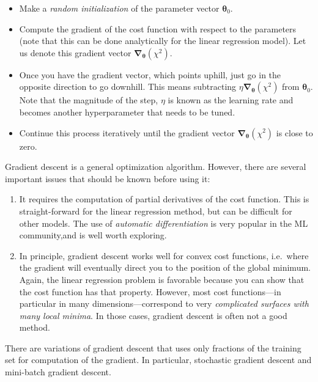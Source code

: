 \documentclass[%
oneside,                 %
final,                   %
10pt]{article}
\begin{document}
\begin{itemize}
\item Make a \emph{random initialization} of the parameter vector $\bm{\theta}_0$.

\item Compute the gradient of the cost function with respect to the parameters (note that this can be done analytically for the linear regression model). Let us denote this gradient vector $\bm{\nabla}_{\bm{\theta}} \left( \chi^2 \right)$.

\item Once you have the gradient vector, which points uphill, just go in the opposite direction to go downhill. This means subtracting $\eta \bm{\nabla}_{\bm{\theta}} \left( \chi^2 \right)$ from $\bm{\theta}_0$. Note that the magnitude of the step, $\eta$ is known as the learning rate and becomes another hyperparameter that needs to be tuned.

\item Continue this process iteratively until the gradient vector $\bm{\nabla}_{\bm{\theta}} \left( \chi^2 \right)$ is close to zero.
\end{itemize}

\noindent
Gradient descent is a general optimization algorithm. However, there are several important issues that should be known before using it:

\begin{enumerate}
\item It requires the computation of partial derivatives of the cost function. This is straight-forward for the linear regression method, but can be difficult for other models. The use of \emph{automatic differentiation} is very popular in the ML community,and is well worth exploring. 

\item In principle, gradient descent works well for convex cost functions, i.e.~where the gradient will eventually direct you to the position of the global minimum. Again, the linear regression problem is favorable because you can show that the cost function has that property. However, most cost functions---in particular in many dimensions---correspond to very \emph{complicated surfaces with many local minima}. In those cases, gradient descent is often not a good method.
\end{enumerate}

\noindent
There are variations of gradient descent that uses only fractions of the training set for computation of the gradient. In particular, stochastic gradient descent and mini-batch gradient descent.
\end{document}
